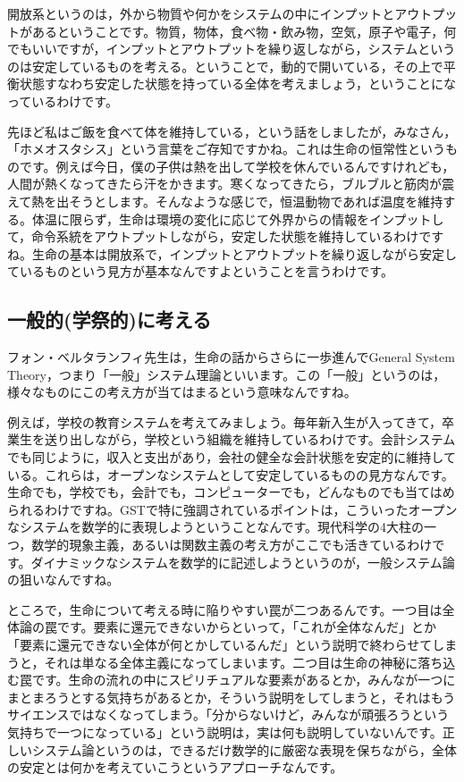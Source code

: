 \documentclass{ltjsbook}
\begin{document}
開放系というのは，外から物質や何かをシステムの中にインプットとアウトプットがあるということです。物質，物体，食べ物・飲み物，空気，原子や電子，何でもいいですが，インプットとアウトプットを繰り返しながら，システムというのは安定しているものを考える。ということで，動的で開いている，その上で平衡状態すなわち安定した状態を持っている全体を考えましょう，ということになっているわけです。

先ほど私はご飯を食べて体を維持している，という話をしましたが，みなさん，「ホメオスタシス」という言葉をご存知ですかね。これは生命の恒常性というものです。例えば今日，僕の子供は熱を出して学校を休んでいるんですけれども，人間が熱くなってきたら汗をかきます。寒くなってきたら，ブルブルと筋肉が震えて熱を出そうとします。そんなような感じで，恒温動物であれば温度を維持する。体温に限らず，生命は環境の変化に応じて外界からの情報をインプットして，命令系統をアウトプットしながら，安定した状態を維持しているわけですね。生命の基本は開放系で，インプットとアウトプットを繰り返しながら安定しているものという見方が基本なんですよということを言うわけです。
\subsection{一般的(学祭的)に考える}
フォン・ベルタランフィ先生は，生命の話からさらに一歩進んでGeneral System Theory，つまり「一般」システム理論といいます。この「一般」というのは，様々なものにこの考え方が当てはまるという意味なんですね。

例えば，学校の教育システムを考えてみましょう。毎年新入生が入ってきて，卒業生を送り出しながら，学校という組織を維持しているわけです。会計システムでも同じように，収入と支出があり，会社の健全な会計状態を安定的に維持している。これらは，オープンなシステムとして安定しているものの見方なんです。生命でも，学校でも，会計でも，コンピューターでも，どんなものでも当てはめられるわけですね。GSTで特に強調されているポイントは，こういったオープンなシステムを数学的に表現しようということなんです。現代科学の4大柱の一つ，数学的現象主義，あるいは関数主義の考え方がここでも活きているわけです。ダイナミックなシステムを数学的に記述しようというのが，一般システム論の狙いなんですね。

ところで，生命について考える時に陥りやすい罠が二つあるんです。一つ目は全体論の罠です。要素に還元できないからといって，「これが全体なんだ」とか「要素に還元できない全体が何とかしているんだ」という説明で終わらせてしまうと，それは単なる全体主義になってしまいます。二つ目は生命の神秘に落ち込む罠です。生命の流れの中にスピリチュアルな要素があるとか，みんなが一つにまとまろうとする気持ちがあるとか，そういう説明をしてしまうと，それはもうサイエンスではなくなってしまう。「分からないけど，みんなが頑張ろうという気持ちで一つになっている」という説明は，実は何も説明していないんです。正しいシステム論というのは，できるだけ数学的に厳密な表現を保ちながら，全体の安定とは何かを考えていこうというアプローチなんです。
\end{document}
